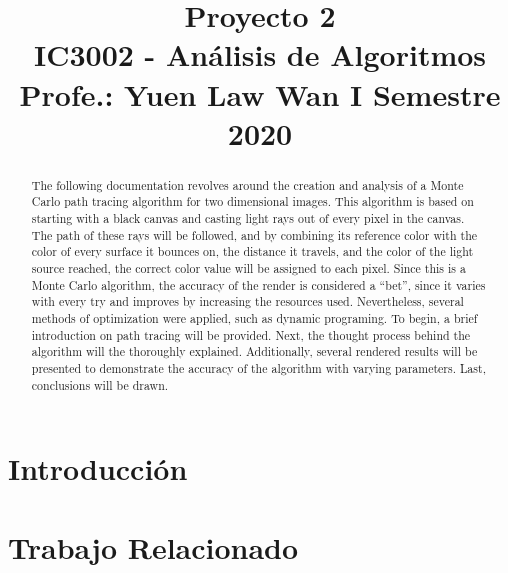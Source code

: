 \documentclass[conference]{IEEEtran}
\begin{document}
\title{Proyecto 2\\
{\footnotesize \textsuperscript{}IC3002 - Análisis de Algoritmos}
{\footnotesize \textsuperscript{}Profe.: Yuen Law Wan}
{\footnotesize \textsuperscript{}I Semestre 2020}
}

\author{
\and
{}
}

\maketitle

\begin{abstract}
The following documentation revolves around the creation and analysis of a Monte Carlo path tracing algorithm for two dimensional images. This algorithm is based on starting with a black canvas and casting light rays out of every pixel in the canvas. The path of these rays will be followed, and by combining its reference color with the color of every surface it bounces on, the distance it travels, and the color of the light source reached, the correct color value will be assigned to each pixel. Since this is a Monte Carlo algorithm, the accuracy of the render is considered a “bet”, since it varies with every try and improves by increasing the resources used. Nevertheless, several methods of optimization were applied, such as dynamic programing. To begin, a brief introduction on path tracing will be provided. Next, the thought process behind the algorithm will the thoroughly explained. Additionally, several rendered results will be presented to demonstrate the accuracy of the algorithm with varying parameters. Last, conclusions will be drawn. 

\end{abstract}

\section{Introducción}

\section{Trabajo Relacionado}
\end{document}
